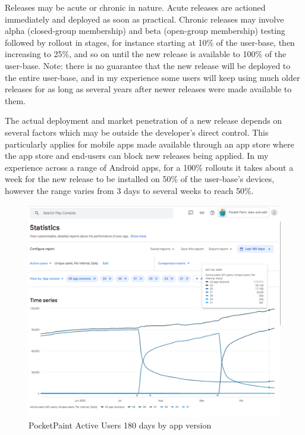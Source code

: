 Releases may be acute or chronic in nature. Acute releases are actioned immediately and deployed as soon as practical. Chronic releases may involve alpha (closed-group membership) and beta (open-group membership) testing followed by rollout in stages, for instance starting at 10\% of the user-base, then increasing to 25\%, and so on until the new release is available to 100\% of the user-base. Note: there is no guarantee that the new release will be deployed to the entire user-base, and in my experience some users will keep using much older releases for as long as several years after newer releases were made available to them. 

The actual deployment and market penetration of a new release depends on several factors which may be outside the developer's direct control. This particularly applies for mobile apps made available through an app store where the app store and end-users can block new releases being applied. In my experience across a range of Android apps, for a 100\% rollouts it takes about a week for the new release to be installed on 50\% of the user-base's devices, however the range varies from 3 days to several weeks to reach 50\%.  

\begin{figure}
    \includegraphics[width=\linewidth]{images/android-vitals-screenshots/catrobat/PocketPaint-ActiveUsers-180days-2020-10-29.pdf}
    \caption{PocketPaint Active Users 180 days by app version}
    \label{fig:pocketpaint-180d-active-users}
\end{figure}

